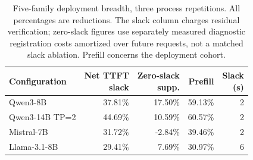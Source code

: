 \begin{table}[t]
\centering\small
\caption{Five-family deployment breadth, three process repetitions. All percentages are reductions. The slack column charges residual verification; zero-slack figures use separately measured diagnostic registration costs amortized over future requests, not a matched slack ablation. Prefill concerns the deployment cohort.}
\label{tab:deployment-width}
\begin{tabular}{@{}lrrrr@{}}
\toprule
Configuration & \shortstack{Net TTFT\\slack} & \shortstack{Zero-slack\\supp.} & Prefill & \shortstack{Slack\\(s)}\\
\midrule
Qwen3-8B & 37.81\% & 17.50\% & 59.13\% & 2\\
Qwen3-14B TP=2 & 44.69\% & 10.59\% & 60.57\% & 2\\
Mistral-7B & 31.72\% & -2.84\% & 39.46\% & 2\\
Llama-3.1-8B & 29.41\% & 7.69\% & 30.97\% & 6\\
\bottomrule
\end{tabular}
\end{table}
